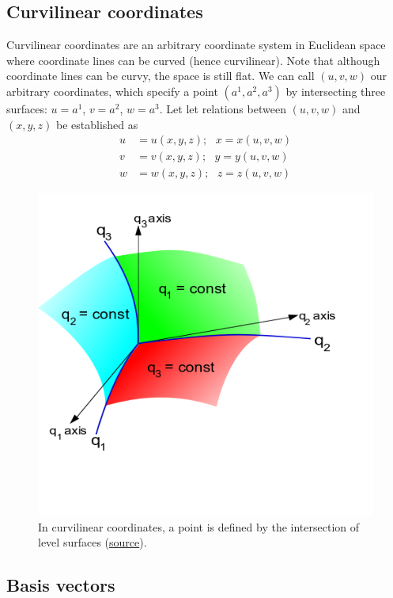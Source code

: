 \documentclass{article}
\theoremstyle{definition}
\begin{document}
\subsection{Curvilinear coordinates}
Curvilinear coordinates are an arbitrary coordinate system in Euclidean space where coordinate lines can be curved (hence curvilinear). Note that although coordinate lines can be curvy, the space is still flat. We can call $(u,v,w)$ our arbitrary coordinates, which specify a point $(a^1,a^2,a^3)$ by intersecting three surfaces: $u = a^1$, $v=a^2$, $w=a^3$. Let let relations between $(u,v,w)$ and $(x,y,z)$ be established as
\begin{align*}
u &= u(x,y,z); \text{ } x = x(u,v,w)\\
v &= v(x,y,z); \text{ } y = y(u,v,w)\\
w &= w(x,y,z); \text{ } z = z(u,v,w)
\end{align*} 
\begin{figure}[h!]
	\centering
	\includegraphics[scale=0.5]{gr-fig-5.png}
	\caption{In curvilinear coordinates, a point is defined by the intersection of level surfaces (\href{https://en.wikipedia.org/wiki/Curvilinear_coordinates}{source}).}
\end{figure}

\subsection{Basis vectors}
\end{document}
